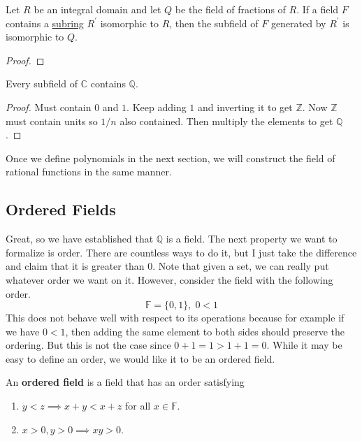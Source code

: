   \begin{corollary}
    \label{thm:extending-a-field-embedding-to-the-fraction}
    Let $R$ be an integral domain and let $Q$ be the field of fractions of $R$. If a field $F$ contains a \hyperref[def:subring]{subring} $R^\prime$ isomorphic to $R$, then the subfield of $F$ generated by $R^\prime$ is isomorphic to $Q$. 
  \end{corollary}
  \begin{proof}
    
  \end{proof}
  
  \begin{lemma}
    \label{thm:rationals-are-a-minimal-field}
    Every subfield of $\mathbb{C}$ contains $\mathbb{Q}$. 
  \end{lemma}
  \begin{proof}
    Must contain $0$ and $1$. Keep adding $1$ and inverting it to get $\mathbb{Z}$. Now $\mathbb{Z}$ must contain units so $1/n$ also contained. Then multiply the elements to get $\mathbb{Q}$. 
  \end{proof} 

  Once we define polynomials in the next section, we will construct the field of rational functions in the same manner. 

\subsection{Ordered Fields}

  Great, so we have established that $\mathbb{Q}$ is a field. The next property we want to formalize is order. There are countless ways to do it, but I just take the difference and claim that it is greater than $0$. Note that given a set, we can really put whatever order we want on it. However, consider the field with the following order. 
  \begin{equation}
    \mathbb{F} = \{0, 1\}, \; 0 < 1
  \end{equation} 
  This does not behave well with respect to its operations because for example if we have $0 < 1$, then adding the same element to both sides should preserve the ordering. But this is not the case since $0 + 1 = 1 > 1 + 1 = 0$. While it may be easy to define an order, we would like it to be an ordered field. 

  \begin{definition}
    \label{def:ordered-field}
    An \textbf{ordered field} is a field that has an order satisfying 
    \begin{enumerate}
      \item $y < z \implies x + y < x + z$ for all $x \in \mathbb{F}$. 
      \item $x > 0, y > 0 \implies xy > 0$. 
    \end{enumerate}
  \end{definition}


